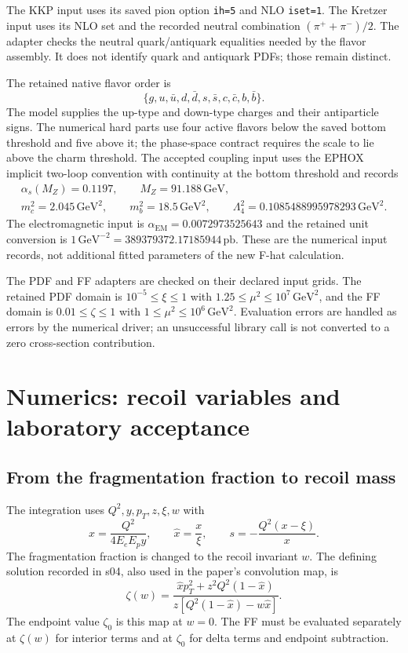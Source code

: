 \documentclass[11pt,a4paper]{article}
\newcommand{\GeV}{\mathrm{GeV}}
\newcommand{\pb}{\mathrm{pb}}
\begin{document}
The KKP input uses its saved pion option \texttt{ih=5} and NLO
\texttt{iset=1}. The Kretzer input uses its NLO set and the recorded
neutral combination $(\pi^++\pi^-)/2$. The adapter checks the
neutral quark/antiquark equalities needed by the flavor assembly. It
does not identify quark and antiquark PDFs; those remain distinct.

The retained native flavor order is
\begin{equation}
 \{g,u,\bar u,d,\bar d,s,\bar s,c,\bar c,b,\bar b\}.
\end{equation}
The model supplies the up-type and down-type charges and their
antiparticle signs. The numerical hard parts use four active flavors
below the saved bottom threshold and five above it; the phase-space
contract requires the scale to lie above the charm threshold. The
accepted coupling input uses the EPHOX implicit two-loop convention
with continuity at the bottom threshold and records
\begin{gather}
 \alpha_s(M_Z)=0.1197,\qquad M_Z=91.188\,\GeV,\\
 m_c^2=2.045\,\GeV^2,\qquad m_b^2=18.5\,\GeV^2,\qquad
 \Lambda_4^2=0.1085488995978293\,\GeV^2.
\end{gather}
The electromagnetic input is
$\alpha_{\mathrm{EM}}=0.0072973525643$ and the retained unit
conversion is $1\,\GeV^{-2}=389379372.17185944\,\pb$.
These are the numerical input records, not additional fitted parameters
of the new F-hat calculation.

The PDF and FF adapters are checked on their declared input grids. The
retained PDF domain is $10^{-5}\leq\xi\leq1$ with
$1.25\leq\mu^2\leq10^7\,\GeV^2$, and the FF domain is
$0.01\leq\zeta\leq1$ with
$1\leq\mu^2\leq10^6\,\GeV^2$. Evaluation errors are handled as
errors by the numerical driver; an unsuccessful library call is not
converted to a zero cross-section contribution.

\section{Numerics: recoil variables and laboratory acceptance}
\label{sec:nummap}

\subsection{From the fragmentation fraction to recoil mass}

The integration uses $Q^2,y,p_T,z,\xi,w$ with
\begin{equation}
 x=\frac{Q^2}{4E_eE_p y},\qquad \hat x=\frac{x}{\xi},\qquad
 s=-\frac{Q^2(x-\xi)}{x}.
\end{equation}
The fragmentation fraction is changed to the recoil invariant $w$.
The defining solution recorded in s04, also used in the paper's
convolution map, is
\begin{equation}
 \zeta(w)=
 \frac{\hat x p_T^2+z^2Q^2(1-\hat x)}
 {z[Q^2(1-\hat x)-w\hat x]}.
 \label{eq:zetamap}
\end{equation}
The endpoint value $\zeta_0$ is this map at $w=0$. The FF must be
evaluated separately at $\zeta(w)$ for interior terms and at
$\zeta_0$ for delta terms and endpoint subtraction.
\end{document}
